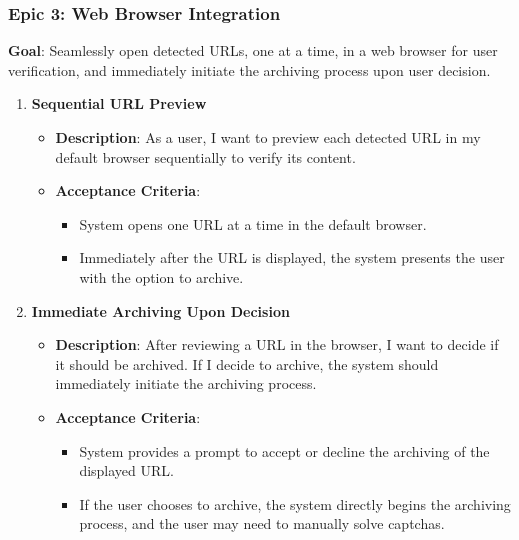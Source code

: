 \subsubsection{Epic 3: Web Browser Integration}
\textbf{Goal}: Seamlessly open detected URLs, one at a time, in a web browser for user verification, and immediately initiate the archiving process upon user decision.

\begin{enumerate}
    \item \textbf{Sequential URL Preview}
    \begin{itemize}
        \item \textbf{Description}: As a user, I want to preview each detected URL in my default browser sequentially to verify its content.
        \item \textbf{Acceptance Criteria}:
        \begin{itemize}
            \item System opens one URL at a time in the default browser.
            \item Immediately after the URL is displayed, the system presents the user with the option to archive.
        \end{itemize}
    \end{itemize}

    \item \textbf{Immediate Archiving Upon Decision}
    \begin{itemize}
        \item \textbf{Description}: After reviewing a URL in the browser, I want to decide if it should be archived. If I decide to archive, the system should immediately initiate the archiving process.
        \item \textbf{Acceptance Criteria}:
        \begin{itemize}
            \item System provides a prompt to accept or decline the archiving of the displayed URL.
            \item If the user chooses to archive, the system directly begins the archiving process, and the user may need to manually solve captchas.
        \end{itemize}
    \end{itemize}


\end{enumerate}
